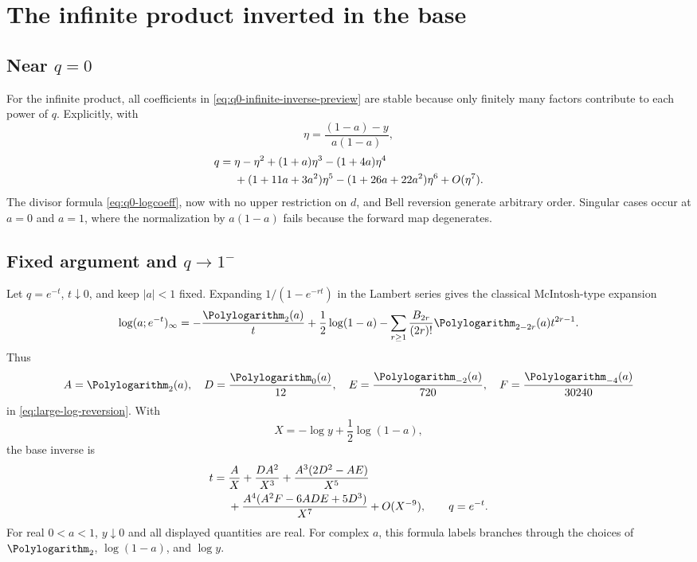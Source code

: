 \documentclass[11pt,letterpaper,oneside,openany]{book}
\theoremstyle{definition}
\theoremstyle{remark}
\begin{document}
\chapter{The infinite product inverted in the base}

\section{Near \texorpdfstring{\(q=0\)}{q=0}}
For the infinite product, all coefficients in
\eqref{eq:q0-infinite-inverse-preview} are stable because only finitely many
factors contribute to each power of \(q\).  Explicitly, with
\[
 \eta=\frac{(1-a)-y}{a(1-a)},
\]
\begin{align}
 q={}&\eta-\eta^2+(1+a)\eta^3-(1+4a)\eta^4\notag\\
 &+(1+11a+3a^2)\eta^5-(1+26a+22a^2)\eta^6+O(\eta^7).
 \label{eq:infinite-q0-inverse}
\end{align}
The divisor formula \eqref{eq:q0-logcoeff}, now with no upper restriction on
\(d\), and Bell reversion generate arbitrary order.  Singular cases occur at
\(a=0\) and \(a=1\), where the normalization by \(a(1-a)\) fails because the
forward map degenerates.

\section{Fixed argument and \texorpdfstring{\(q\to1^-\)}{q to 1}}
Let \(q=e^{-t}\), \(t\downarrow0\), and keep \(|a|<1\) fixed.  Expanding
\(1/(1-e^{-rt})\) in the Lambert series gives the classical McIntosh-type
expansion \cite{McIntosh1999,BanerjeeWilkerson}
\begin{equation}\label{eq:fixed-a-q1}
 \log(a;e^{-t})_\infty
 =-\frac{\Polylogarithm_2(a)}{t}+\frac12\log(1-a)
 -\sum_{r\ge1}\frac{B_{2r}}{(2r)!}\Polylogarithm_{2-2r}(a)t^{2r-1}.
\end{equation}
Thus
\[
 A=\Polylogarithm_2(a),\quad
 D=\frac{\Polylogarithm_0(a)}{12},\quad
 E=\frac{\Polylogarithm_{-2}(a)}{720},\quad
 F=\frac{\Polylogarithm_{-4}(a)}{30240}
\]
in \eqref{eq:large-log-reversion}.  With
\[
 X=-\log y+\frac12\log(1-a),
\]
the base inverse is
\begin{align}
 t={}&\frac{A}{X}+\frac{DA^2}{X^3}
 +\frac{A^3(2D^2-AE)}{X^5}\notag\\
 &+\frac{A^4(A^2F-6ADE+5D^3)}{X^7}+O(X^{-9}),
 \qquad q=e^{-t}.
 \label{eq:fixed-a-q1-inverse}
\end{align}
For real \(0<a<1\), \(y\downarrow0\) and all displayed quantities are real.
For complex \(a\), this formula labels branches through the choices of
\(\Polylogarithm_2\), \(\log(1-a)\), and \(\log y\).
\end{document}
